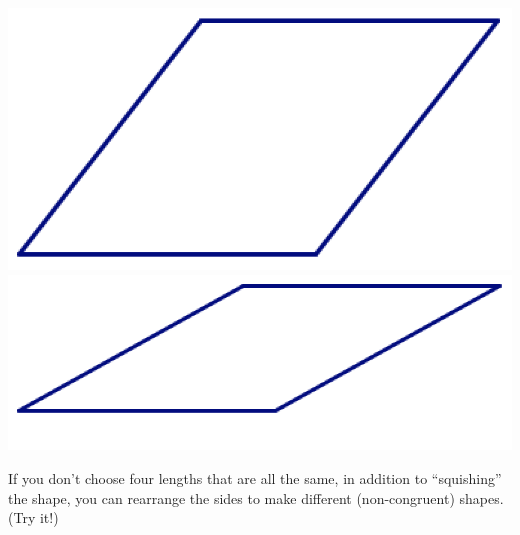 \begin{center}
\bigskip
\includegraphics[scale = .45]{rhomb2}
\qquad
\includegraphics[scale = .45]{rhomb3}
\end{center}

If you don't choose four lengths that are all the same, in addition to ``squishing'' the shape, you can rearrange the sides to make different (non-congruent) shapes.  (Try it!)

